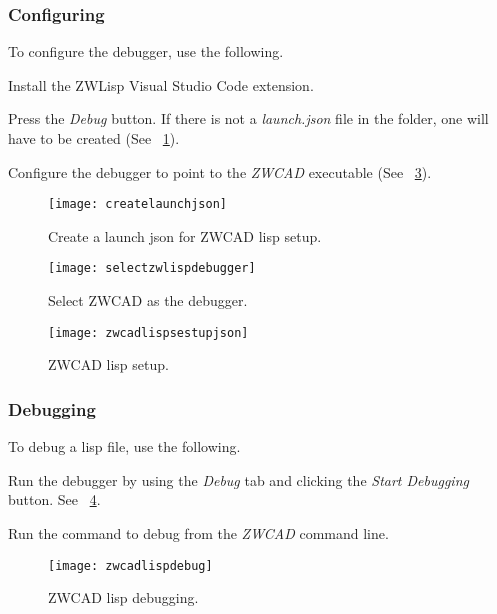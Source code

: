 \subsubsection{Configuring}
To configure the debugger, use the following.
\begin{numberedlist}
	\item Install the ZWLisp Visual Studio Code extension.
	\item Press the \emph{Debug} button.  If there is not a \emph{launch.json} file in the folder, one will have to be created (See \figurename~\ref{fig:createlaunchjson}).
	\item Configure the debugger to point to the \emph{ZWCAD} executable (See \figurename~\ref{fig:zwcadlispsestupjson}).
\end{numberedlist}

\begin{figure}
	\centering
	\texttt{[image: createlaunchjson]}
	\caption{Create a launch json for ZWCAD lisp setup.}
	\label{fig:createlaunchjson}
\end{figure}

\begin{figure}
	\centering
	\texttt{[image: selectzwlispdebugger]}
	\caption{Select ZWCAD as the debugger.}
	\label{fig:selectzwlispdebugger}
\end{figure}

\begin{figure}
	\centering
	\texttt{[image: zwcadlispsestupjson]}
	\caption{ZWCAD lisp setup.}
	\label{fig:zwcadlispsestupjson}
\end{figure}

\subsubsection{Debugging}
To debug a lisp file, use the following.
\begin{numberedlist}
	\item Run the debugger by using the \textit{Debug} tab and clicking the \textit{Start Debugging} button.  See \figurename~\ref{fig:zwcadlispdebug}.
	\item Run the command to debug from the \emph{ZWCAD} command line.
\end{numberedlist}

\begin{figure}
	\centering
	\texttt{[image: zwcadlispdebug]}
	\caption{ZWCAD lisp debugging.}
	\label{fig:zwcadlispdebug}
\end{figure} 